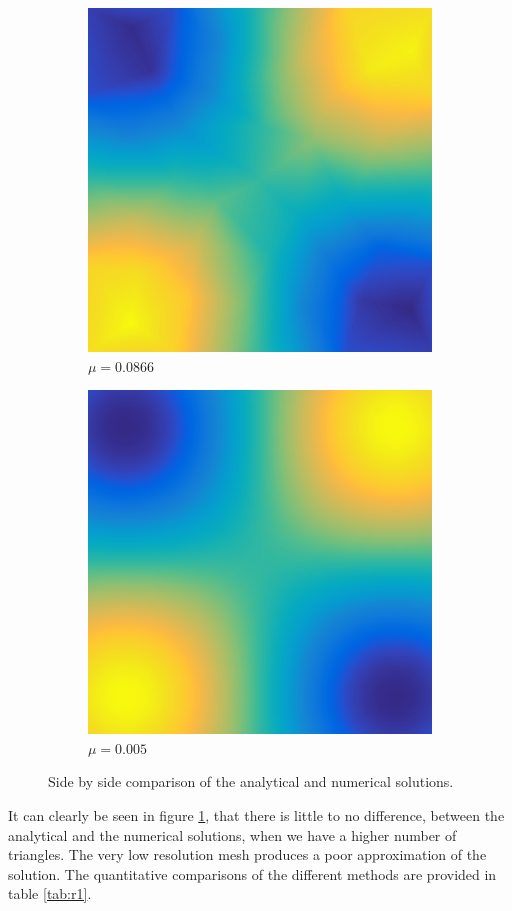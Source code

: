 \documentclass[../fem.tex]{subfile}
\begin{document}
\begin{figure}[htpb]
\begin{subfigure}{0.4\textwidth}
    \includegraphics[width=0.8\linewidth]{figures/r3/approx.png}
    \caption{$\mu=0.0866$}
  \end{subfigure}
  \begin{subfigure}{0.4\textwidth}
    \centering
    \includegraphics[width=0.8\linewidth]{figures/r4/approx.png}
    \caption{$\mu=0.005$}
  \end{subfigure}
  \caption{Side by side comparison of the analytical and numerical solutions.}
  \label{fig:r1_soln}
\end{figure}

It can clearly be seen in figure \ref{fig:r1_soln}, that there is little to no
difference, between the analytical and the numerical solutions, when we have a
higher number of triangles. The very low resolution mesh produces a poor
approximation of the solution. The quantitative comparisons of the different
methods are provided in table \ref{tab:r1}.
\end{document}
